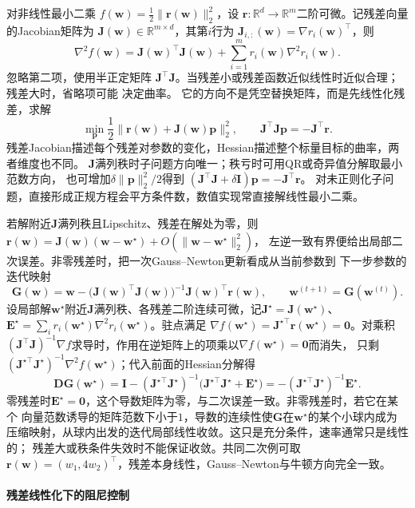 对非线性最小二乘
$f(\bm{w})=\frac12\lVert\bm{r}(\bm{w})\rVert_2^2$，设
$\bm{r}:\mathbb{R}^d\to\mathbb{R}^m$二阶可微。记残差向量的Jacobian矩阵为
$\bm{J}(\bm{w})\in\mathbb{R}^{m\times d}$，其第$i$行为
$\bm{J}_{i,:}(\bm{w})=\nabla r_i(\bm{w})^{\top}$，则
\[
  \nabla^2f(\bm{w})
  =\bm{J}(\bm{w})^{\top}\bm{J}(\bm{w})
  +\sum_{i=1}^m r_i(\bm{w})\nabla^2r_i(\bm{w}).
\]
忽略第二项，使用半正定矩阵
$\bm{J}^{\top}\bm{J}$。当残差小或残差函数近似线性时近似合理；残差大时，省略项可能
决定曲率。
它的方向不是凭空替换矩阵，而是先线性化残差，求解
\[
 \min_{\bm p}\frac12\|\bm r(\bm w)+\bm J(\bm w)\bm p\|_2^2,
 \qquad
 \bm J^\top\bm J\bm p=-\bm J^\top\bm r.
\]
残差Jacobian描述每个残差对参数的变化，Hessian描述整个标量目标的曲率，两者维度也不同。
$\bm J$满列秩时子问题方向唯一；秩亏时可用QR或奇异值分解取最小范数方向，
也可增加$\delta\|\bm p\|_2^2/2$得到
$(\bm J^\top\bm J+\delta\bm I)\bm p=-\bm J^\top\bm r$。
对未正则化子问题，直接形成正规方程会平方条件数，数值实现常直接解线性最小二乘。

若解附近$\bm J$满列秩且Lipschitz、残差在解处为零，则
$\bm r(\bm w)=\bm J(\bm w)(\bm w-\bm w^\star)+O(\|\bm w-\bm w^\star\|_2^2)$，
左逆一致有界便给出局部二次误差。非零残差时，把一次Gauss--Newton更新看成从当前参数到
下一步参数的迭代映射
\[
 \bm G(\bm w)=\bm w-\bigl(\bm J(\bm w)^\top\bm J(\bm w)\bigr)^{-1}\bm J(\bm w)^\top\bm r(\bm w),
 \qquad \bm w^{(t+1)}=\bm G(\bm w^{(t)}).
\]
设局部解$\bm w^\star$附近$\bm J$满列秩、各残差二阶连续可微，记$\bm J^\star=\bm J(\bm w^\star)$、
$\bm E^\star=\sum_i r_i(\bm w^\star)\nabla^2r_i(\bm w^\star)$。驻点满足
$\nabla f(\bm w^\star)=\bm J^{\star\top}\bm r(\bm w^\star)=\bm 0$。对乘积
$(\bm J^\top\bm J)^{-1}\nabla f$求导时，作用在逆矩阵上的项乘以$\nabla f(\bm w^\star)=\bm0$而消失，
只剩$(\bm J^{\star\top}\bm J^\star)^{-1}\nabla^2f(\bm w^\star)$；代入前面的Hessian分解得
\[
 \bm D\bm G(\bm w^\star)
 =\bm I-(\bm J^{\star\top}\bm J^\star)^{-1}\bigl(\bm J^{\star\top}\bm J^\star+\bm E^\star\bigr)
 =-(\bm J^{\star\top}\bm J^\star)^{-1}\bm E^\star.
\]
零残差时$\bm E^\star=\bm 0$，这个导数矩阵为零，与二次误差一致。非零残差时，若它在某个
向量范数诱导的矩阵范数下小于$1$，导数的连续性使$\bm G$在$\bm w^\star$的某个小球内成为
压缩映射，从球内出发的迭代局部线性收敛。这只是充分条件，速率通常只是线性的；
残差大或秩条件失效时不能保证收敛。共同二次例可取
$\bm r(\bm w)=(w_1,4w_2)^\top$，残差本身线性，Gauss--Newton与牛顿方向完全一致。

\paragraph{残差线性化下的阻尼控制}
\label{sec:opt-levenberg-marquardt}


